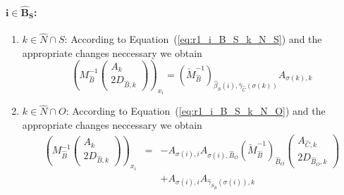 \documentclass[a4paper]{article}
\begin{document}
\paragraph{$\mathbf{i \in \hat{B}_{S}}$:}
\begin{enumerate}
\item $k \in \hat{N} \cap S$:
According to Equation~(\ref{eq:r1_i_B_S_k_N_S}) and the appropriate changes
neccessary we obtain
\begin{equation}
\label{eq:r2_i_B_S_k_N_S}
\left(
  M_{\hat{B}}^{-1}
  \left(\begin{array}{c}
          A_{k} \\
	  \hline
	  2D_{\hat{B}, k}
	\end{array}
  \right)
\right)_{x_{i}}
=
\left(\check{M}_{\hat{B}}^{-1}\right)_{\hat{\beta}_{S}(i),
\hat{\gamma}_{\hat{C}}(\sigma(k))}
  A_{\sigma(k), k}
\end{equation}
\item $k \in \hat{N} \cap O$:
According to Equation~(\ref{eq:r1_i_B_S_k_N_O}) and the appropriate changes
neccessary we obtain
\begin{eqnarray}
\label{eq:r2_i_B_S_k_N_O}
\left(
  M_{\hat{B}}^{-1}
  \left(\begin{array}{c}
          A_{k} \\
	  \hline
	  2D_{\hat{B}, k}
	\end{array}
  \right)
\right)_{x_{i}}
&=&
-A_{\sigma(i),i}A_{\sigma(i), \hat{B}_{O}}
\left(\check{M}_{\hat{B}}^{-1}\right)_{\hat{B}_{O}}
\left(\begin{array}{c}
        A_{\hat{C},k} \\
	\hline
	2D_{\hat{B}_{O},k}
       \end{array}
\right)
\nonumber \\
&&
+A_{\sigma(i), i}A_{\hat{\gamma}_{S_{\hat{B}}}(\sigma(i)), k}
\end{eqnarray}
\end{enumerate}
\end{document}
